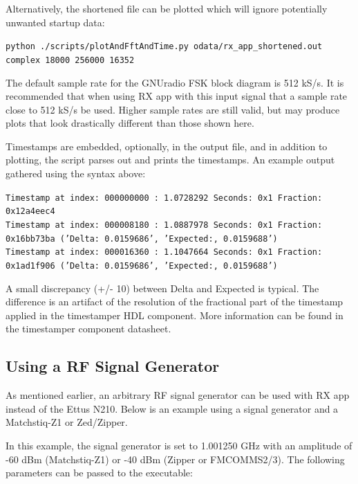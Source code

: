 \noindent Alternatively, the shortened file can be plotted which will ignore potentially unwanted startup data:\par\medskip
\noindent\texttt{python ./scripts/plotAndFftAndTime.py odata/rx\_app\_shortened.out complex 18000 256000 16352}\par\medskip
\noindent The default sample rate for the GNUradio FSK block diagram is 512 kS/s. It is recommended that when using RX app with this input signal that a sample rate close to 512 kS/s be used. Higher sample rates are still valid, but may produce plots that look drastically different than those shown here.\par\medskip
\newpage
\noindent Timestamps are embedded, optionally, in the output file, and in addition to plotting, the script parses out and prints the timestamps. An example output gathered using the syntax above:\par\medskip
\scriptsize\noindent\texttt{Timestamp at index: 000000000 :  1.0728292 Seconds: 0x1 Fraction: 0x12a4eec4  \\
Timestamp at index: 000008180 :  1.0887978 Seconds: 0x1 Fraction: 0x16bb73ba ('Delta: 0.0159686', 'Expected:, 0.0159688')\\
Timestamp at index: 000016360 :  1.1047664 Seconds: 0x1 Fraction: 0x1ad1f906 ('Delta: 0.0159686', 'Expected:, 0.0159688')}\par\medskip
\noindent\small A small discrepancy (+/- 10) between Delta and Expected is typical. The difference is an artifact of the resolution of the fractional part of the timestamp applied in the timestamper HDL component. More information can be found in the timestamper component datasheet.\par\medskip
\par\medskip

\subsection{Using a RF Signal Generator}
\noindent As mentioned earlier, an arbitrary RF signal generator can be used with RX app instead of the Ettus N210. Below is an example using a signal generator and a Matchstiq-Z1 or Zed/Zipper.\par\medskip
\noindent In this example, the signal generator is set to 1.001250 GHz with an amplitude of -60 dBm (Matchstiq-Z1) or -40 dBm (Zipper or FMCOMMS2/3). The following parameters can be passed to the executable:\par\medskip

